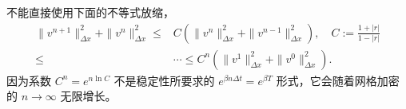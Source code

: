 \begin{remark}
    不能直接使用下面的不等式放缩，
    \begin{align*}
        \|v^{n+1}\|_{\Delta x}^2 +\|v^{n}\|_{\Delta x}^2 \le{} &
        C \left(\|v^{n}\|_{\Delta x}^2 +\|v^{n-1}\|_{\Delta x}^2\right),\quad C:= \frac{1+|r|}{1-|r|} \\
        \le{}                                                  & \cdots \le{}
        C^n \left(\|v^{1}\|_{\Delta x}^2 +\|v^{0}\|_{\Delta x}^2\right).
    \end{align*}
    因为系数 $C^n = e^{n \ln C}$ 不是稳定性所要求的 $e^{\beta n \Delta t} = e^{\beta T}$ 形式，它会随着网格加密的 $n \to \infty$ 无限增长。
\end{remark}
